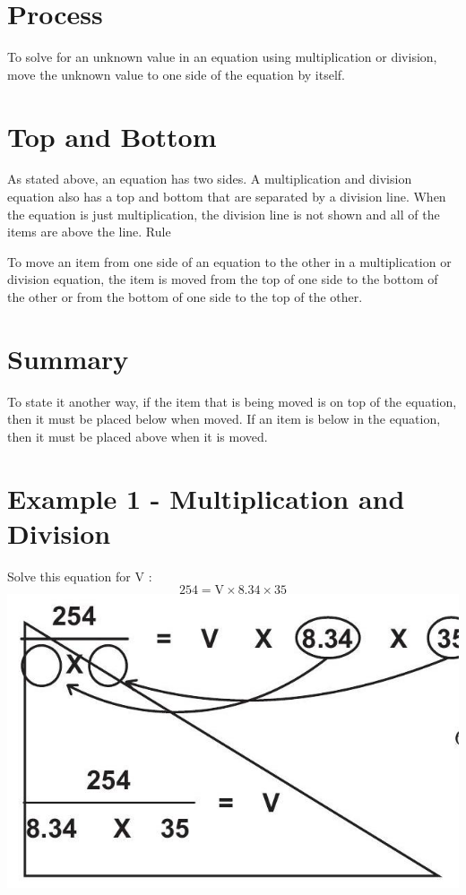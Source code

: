 \documentclass[10pt]{article}
\begin{document}
\section{Process}
To solve for an unknown value in an equation using multiplication or division, move the unknown value to one side of the equation by itself.

\section{Top and Bottom}
As stated above, an equation has two sides. A multiplication and division equation also has a top and bottom that are separated by a division line. When the equation is just multiplication, the division line is not shown and all of the items are above the line. Rule

To move an item from one side of an equation to the other in a multiplication or division equation, the item is moved from the top of one side to the bottom of the other or from the bottom of one side to the top of the other.

\section{Summary}
To state it another way, if the item that is being moved is on top of the equation, then it must be placed below when moved. If an item is below in the equation, then it must be placed above when it is moved.

\section{Example 1 - Multiplication and Division}
Solve this equation for $\mathrm{V}$ :
$$
254=\mathrm{V} \times 8.34 \times 35
$$
\includegraphics[max width=\textwidth]{2022_09_11_72dbedc910e6e984560cg-19}
\end{document}
